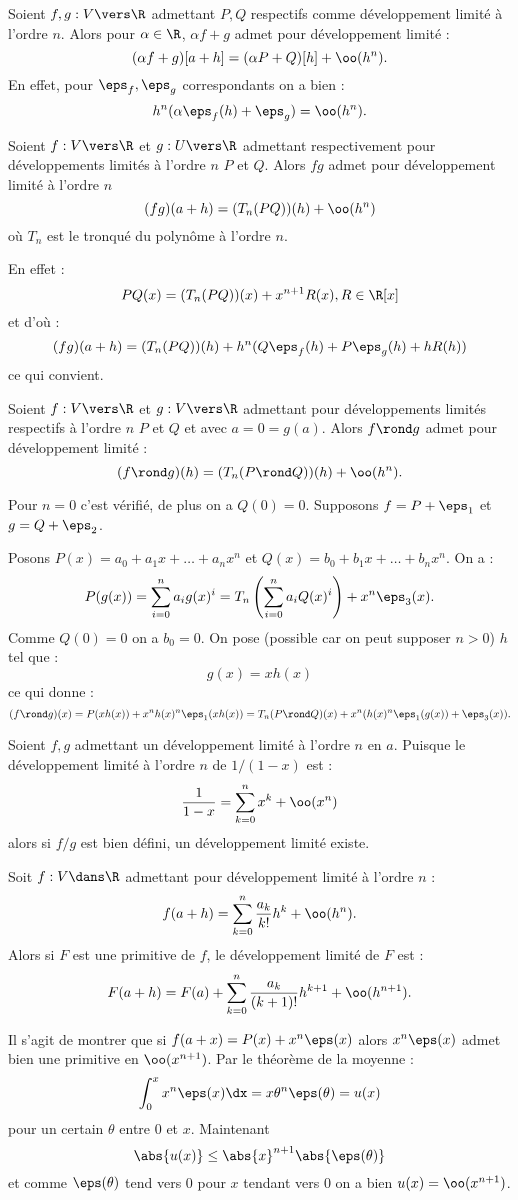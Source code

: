 \documentclass{mybourbaki}
\begin{document}
\propt{}Soient $f,g : V \vers \R$ admettant $P,Q$ respectifs comme développement limité à l'ordre $n$. Alors pour $\alpha\in \R$, $\alpha f +g$ admet pour développement limité : \[ (\alpha f+g)[a+h] = (\alpha P+Q)[h] + \oo(h^{n}).\]
En effet, pour $\eps_f,\eps_g$ correspondants on a bien : \[ h^{n}(\alpha \eps_f(h) + \eps_g) = \oo(h^{n}).\]

\propt{}Soient $f : V \vers \R$ et $g : U \vers \R$ admettant respectivement pour développements limités à l'ordre $n$ $P$ et $Q$. Alors $fg$ admet pour développement limité à l'ordre $n$ \[ (fg)(a+h) = (T_n(P Q))(h) + \oo(h^{n})\]où $T_n$ est le tronqué du polynôme à l'ordre $n$.

En effet : \[ PQ(x)= (T_n(PQ))(x) + x^{n+1}R(x), R\in \R[x]\]et d'où : \[ (fg)(a+h) = (T_n(PQ))(h) + h^{n}(Q\eps_f(h) + P\eps_g(h) + hR(h))\]ce qui convient.

\propt{}Soient $f : V\vers \R$ et $g : V \vers \R$ admettant pour développements limités respectifs à l'ordre $n$ $P$ et $Q$ et avec $a=0=g(a)$. Alors $f\rond g$ admet pour développement limité : \[ (f\rond g)(h) = (T_n(P\rond Q))(h) + \oo(h^{n}).\]

Pour $n=0$ c'est vérifié, de plus on a $Q(0) = 0$. Supposons $f = P + \eps_1$ et $g = Q + \eps_2$.

Posons $P(x) = a_0 + a_1 x +\ldots + a_nx^{n}$ et $Q(x) = b_0 + b_1 x +\ldots + b_nx^{n}$. On a : \[ P(g(x)) = \sum_{i=0}^{n}a_ig(x)^{i} = T_n\left(\sum_{i=0}^{n}a_iQ(x)^{i}\right) + x^{n}\eps_3(x).\]
Comme $Q(0) = 0$ on a $b_0 = 0$.
On pose (possible car on peut supposer $n>0$) $h$ tel que : \[g(x) = xh(x) \]ce qui donne : \[ (f\rond g)(x) = P(xh(x)) + x^{n}h(x)^{n}\eps_1(xh(x)) = T_n(P\rond Q)(x) + x^{n}(h(x)^{n}\eps_1(g(x))+\eps_3(x)).\]

\propt{}Soient $f,g$ admettant un développement limité à l'ordre $n$ en $a$. Puisque le développement limité à l'ordre $n$ de $1/(1-x)$ est : \[ \frac{1}{1-x}=\sum_{k=0}^{n} x^{k} + \oo(x^{n})\]alors si $f/g$ est bien défini, un développement limité existe.


\propt{}Soit $f : V\dans \R$ admettant pour développement limité à l'ordre $n$ : \[ f(a+h) = \sum_{k=0}^{n} \frac{a_k}{k!}h^{k}+ \oo(h^{n}). \]Alors si $F$ est une primitive de $f$, le développement limité de $F$ est : \[ F(a+h) = F(a) + \sum_{k=0}^{n}\frac{a_k}{(k+1)!}h^{k+1} + \oo(h^{n+1}).\]

Il s'agit de montrer que si $f(a+x) = P(x) + x^{n}\eps(x)$ alors $x^{n}\eps(x)$ admet bien une primitive en $\oo(x^{n+1})$. Par le théorème de la moyenne : \[ \int_{0}^{x}x^{n}\eps(x) \dx = x \theta^{n}\eps(\theta) = u(x)\]pour un certain $\theta$ entre $0$ et $x$. Maintenant \[ \abs{u(x)} \leq \abs{x}^{n+1}\abs{\eps(\theta)}\] et comme $\eps(\theta)$ tend vers $0$ pour $x$ tendant vers $0$ on a bien $u(x) = \oo(x^{n+1})$.
\end{document}

